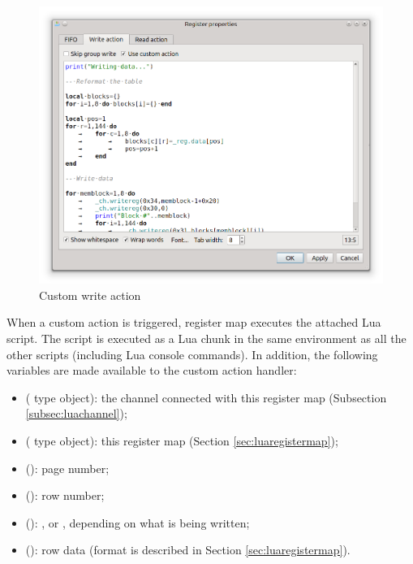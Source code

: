 \documentclass[a4paper,12pt,twoside,extrafontsizes]{memoir}
\begin{document}
\begin{figure}[htbp]
\centering
\includegraphics[scale=0.7]{images/registermapaction.png}
\caption{Custom write action}
\label{fig:registermapaction}
\end{figure}

When a custom action is triggered, register map executes the attached Lua script. The script is executed as a Lua chunk in the same environment as all the other scripts (including Lua console commands). In addition, the following variables are made available to the custom action handler:

\begin{itemize}
	\item {} ( type object): the channel connected with this register map (Subsection \ref{subsec:luachannel});
	\item {} ( type object): this register map (Section \ref{sec:luaregistermap});
	\item {} (): page number;
	\item {} (): row number;
	\item {} (): ,  or , depending on what is being written;
	\item {} (): row data (format is described in Section \ref{sec:luaregistermap}).
\end{itemize}
\end{document}
